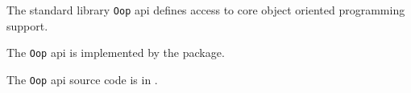 
The standard library {\tt Oop} api defines access to core object oriented programming support.

The {\tt Oop} api is implemented by the  package.

The {\tt Oop} api source code is in .

